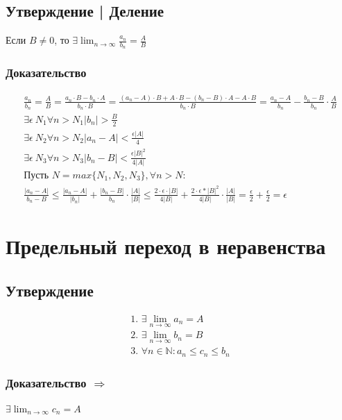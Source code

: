 \documentclass{article}
\begin{document}
\subsection{Утверждение | Деление}
Если $B \neq 0$, то $\exists \lim_{n \to \infty} \frac{a_n}{b_n} = \frac{A}{B}$

\subsubsection{Доказательство}
\begin{gather*}
\frac{a_n}{b_n} = \frac{A}{B} = \frac{a_n \cdot B - b_n \cdot A}{b_n \cdot B} = \frac{(a_n - A) \cdot B + A \cdot B - (b_n - B) \cdot A - A \cdot B}{b_n \cdot B} = \frac{a_n - A}{b_n} - \frac{b_n - B}{b_n} \cdot \frac{A}{B} \\
\exists \epsilon ~ N_1 \forall n > N_1 |b_n| > \frac{B}{2} \\
\exists \epsilon ~ N_2 \forall n > N_2 |a_n - A| < \frac{\epsilon|A|}{4} \\
\exists \epsilon ~ N_3 \forall n > N_3 |b_n - B| < \frac{\epsilon|B|^2}{4|A|} \\
\text{Пусть } N = max\{N_1, N_2, N_3\}, \forall n > N: \\
\frac{|a_n - A|}{b_n - B} \le {} \frac{|a_n - A|}{|b_n|} + \frac{|b_n - B|}{b_n} \cdot \frac{|A|}{|B|} \le \frac{2 \cdot \epsilon \cdot |B|}{4|B|} + \frac{2 \cdot \epsilon* |B|^2}{4|B|} \cdot \frac{|A|}{|B|} = \frac{\epsilon}{2} + \frac{\epsilon}{2} = \epsilon
\end{gather*}



\section{Предельный переход в неравенства}

\subsection{Утверждение}
\begin{gather*}
    \text{1. } \exists \lim_{n \to \infty} a_n = A \\
    \text{2. } \exists \lim_{n \to \infty} b_n = B \\
    \text{3. } \forall n \in \mathbb{N}: a_n \le c_n \le b_n
\end{gather*}

\subsubsection{Доказательство $\Rightarrow$}
$\exists \lim_{n \to \infty} c_n = A$
\end{document}
